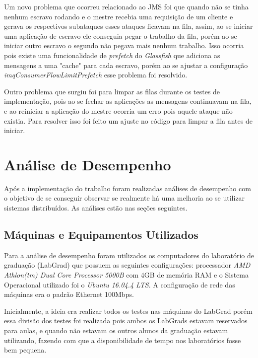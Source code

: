 \documentclass[
	12pt,				%
    oneside,			%
	a4paper,			%
	english,			%
	brazil,				%
	]{abntex2}
\begin{document}
Um novo problema que ocorreu relacionado ao JMS foi que quando não se tinha nenhum escravo rodando e o mestre recebia uma requisição de um cliente e gerava os respectivos subataques esses ataques ficavam na fila, assim, ao se iniciar uma aplicação de escravo ele conseguia pegar o trabalho da fila, porém ao se iniciar outro escravo o segundo não pegava mais nenhum trabalho. Isso ocorria pois existe uma funcionalidade de \textit{prefetch} do \textit{Glassfish} que adiciona as mensagens a uma "cache" para cada escravo, porém ao se ajustar a configuração \textit{imqConsumerFlowLimitPrefetch} esse problema foi resolvido.

Outro problema que surgiu foi para limpar as filas durante os testes de implementação, pois ao se fechar as aplicações as mensagens continuavam na fila, e ao reiniciar a aplicação do mestre ocorria um erro pois aquele ataque não existia. Para resolver isso foi feito um ajuste no código para limpar a fila antes de iniciar.


\chapter{Análise de Desempenho} 
Após a implementação do trabalho foram realizadas análises de desempenho com o objetivo de se conseguir observar se realmente
há uma melhoria ao se utilizar sistemas distribuídos. As análises estão nas seções seguintes.



\section{Máquinas e Equipamentos Utilizados}











Para a análise de desempenho foram utilizados os computadores do laboratório de graduação (LabGrad) que possuem as seguintes configurações: processador \textit{AMD Athlon(tm) Dual Core Processor 5000B} com 4GB de memória RAM e o Sistema Operacional utilizado foi o \textit{Ubuntu 16.04.4 LTS}. A configuração de rede das máquinas era o padrão Ethernet 100Mbps.

Inicialmente, a ideia era realizar todos os testes nas máquinas do LabGrad porém essa divisão dos testes foi realizada pois ambos os LabGrads estavam reservados para aulas, e quando não estavam os outros alunos da graduação estavam utilizando, fazendo com que a disponibilidade de tempo nos laboratórios fosse bem pequena. 
\end{document}
